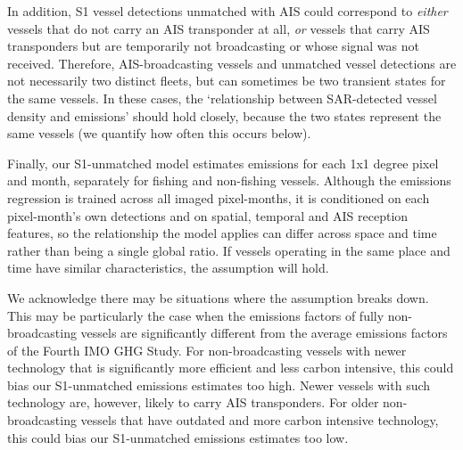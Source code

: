 \documentclass[11pt]{article}
\begin{document}
In addition, S1 vessel detections unmatched with AIS could correspond to \textit{either} vessels that do not carry an AIS transponder at all, \textit{or} vessels that carry AIS transponders but are temporarily not broadcasting or whose signal was not received. Therefore, AIS-broadcasting vessels and unmatched vessel detections are not necessarily two distinct fleets, but can sometimes be two transient states for the same vessels. In these cases, the `relationship between SAR-detected vessel density and emissions' should hold closely, because the two states represent the same vessels (we quantify how often this occurs below).

Finally, our S1-unmatched model estimates emissions for each 1x1 degree pixel and month, separately for fishing and non-fishing vessels. Although the emissions regression is trained across all imaged pixel-months, it is conditioned on each pixel-month's own detections and on spatial, temporal and AIS reception features, so the relationship the model applies can differ across space and time rather than being a single global ratio. If vessels operating in the same place and time have similar characteristics, the assumption will hold.

We acknowledge there may be situations where the assumption breaks down. This may be particularly the case when the emissions factors of fully non-broadcasting vessels are significantly different from the average emissions factors of the Fourth IMO GHG Study. For non-broadcasting vessels with newer technology that is significantly more efficient and less carbon intensive, this could bias our S1-unmatched emissions estimates too high. Newer vessels with such technology are, however, likely to carry AIS transponders. For older non-broadcasting vessels that have outdated and more carbon intensive technology, this could bias our S1-unmatched emissions estimates too low. 
\end{document}

